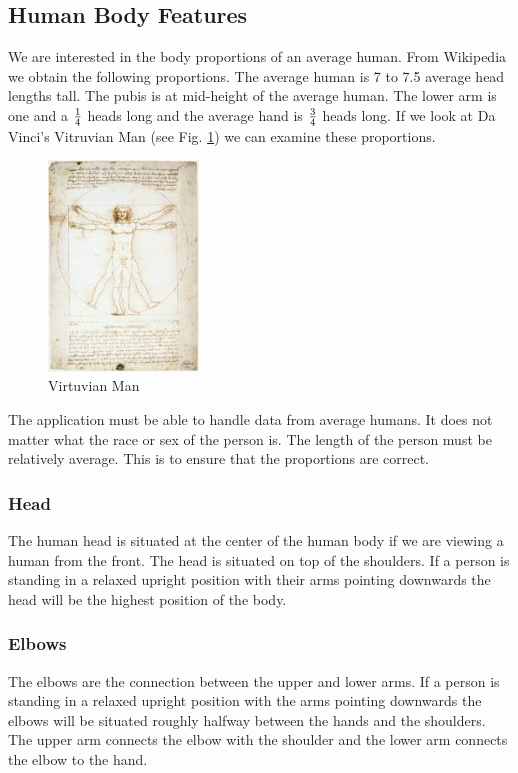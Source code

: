 \documentclass[a4paper,11pt,titlepage]{article}
\begin{document}
\subsection{Human Body Features}
We are interested in the body proportions of an average human. From Wikipedia \cite{wiki} we obtain the following proportions.
The average human is 7 to 7.5 average head lengths tall. The pubis is at mid-height of the average human. The lower arm is one and a $1 \over 4$ heads long and the average hand is $3 \over 4$ heads long. If we look at Da Vinci's Vitruvian Man (see Fig. \ref{Fig:vitruvian}) we can examine these proportions.
\begin{figure}[htbp]
   \centering
   \includegraphics[width=4cm]{Vitruvian.png}
   \caption{Virtuvian Man}
   \label{Fig:vitruvian}
\end{figure}

The application must be able to handle data from average humans. It does not matter what the race or sex of the person is. The length of the person must be relatively average. This is to ensure that the proportions are correct.

\subsubsection{Head}
The human head is situated at the center of the human body if we are viewing a human from the front. The head is situated on top of the shoulders. If a person is standing in a relaxed upright position with their arms pointing downwards the head will be the highest position of the body.

\subsubsection{Elbows}
The elbows are the connection between the upper and lower arms. If a person is standing in a relaxed upright position with the arms pointing downwards the elbows will be situated roughly halfway between the hands and the shoulders. The upper arm connects the elbow with the shoulder and the lower arm connects the elbow to the hand.
\end{document}
